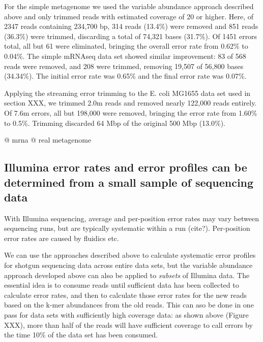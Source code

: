 For the simple metagenome we used the variable abundance approach
described above and only trimmed reads with estimated coverage of 20
or higher.  Here, of 2347 reads containing 234,700 bp, 314 reads
(13.4\%) were removed and 851 reads (36.3\%) were trimmed, discarding
a total of 74,321 bases (31.7\%).  Of 1451 errors total, all but 61
were eliminated, bringing the overall error rate from 0.62\% to
0.04\%.  The simple mRNAseq data set showed similar improvement: 83 of
568 reads were removed, and 208 were trimmed, removing 19,507 of
56,800 bases (34.34\%).  The initial error rate was 0.65\% and the
final error rate was 0.07\%.




Applying the streaming error trimming to the E. coli MG1655 data set
used in section XXX, we trimmed 2.0m reads and removed nearly 122,000
reads entirely.  Of 7.6m errors, all but 198,000 were removed,
bringing the error rate from 1.60\% to 0.5\%.  Trimming discarded 64
Mbp of the original 500 Mbp (13.0\%).

@ mrna
@ real metagenome

\subsection{Illumina error rates and error profiles can be determined from a
small sample of sequencing data}

With Illumina sequencing, average and per-position error rates may
vary between sequencing runs, but are typically systematic within a
run (cite?).  Per-position error rates are caused by fluidics etc.

We can use the approaches described above to calculate systematic
error profiles for shotgun sequencing data across entire data sets,
but the variable abundance approach developed above can also be
applied to {\em subsets} of Illumina data.  The essential idea is to
consume reads until sufficient data has been collected to calculate
error rates, and then to calculate those error rates for the new reads
based on the k-mer abundances from the old reads.  This can aso be
done in one pass for data sets with sufficiently high coverage data:
as shown above (Figure XXX), more than half of the reads will have
sufficient coverage to call errors by the time 10\% of the data set
has been consumed.

